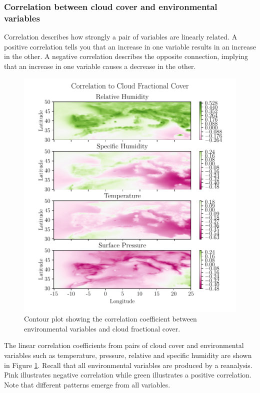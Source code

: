\subsubsection{Correlation between cloud cover and environmental variables}
Correlation describes how strongly a pair of variables are linearly related. A positive correlation tells you that an increase in one variable results in an increase in the other. A negative correlation describes the opposite connection, implying that an increase in one variable causes a decrease in the other.
\begin{figure}[ht]
    \centering
    \includegraphics{python_figs/correlation_figure.pdf}
    \caption{Contour plot showing the correlation coefficient between environmental variables and cloud fractional cover.}
    \label{fig:correlation_tcc_vs_envio}
\end{figure}

The linear correlation coefficients from pairs of cloud cover and environmental variables such as temperature, pressure, relative and specific humidity are shown in Figure \ref{fig:correlation_tcc_vs_envio}. Recall that all environmental variables are produced by a reanalysis. Pink illustrates negative correlation while green illustrates a positive correlation. Note that different patterns emerge from all variables. %


